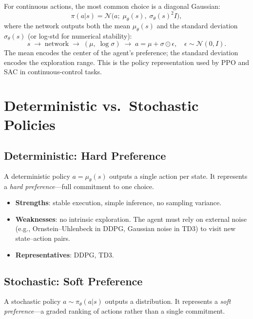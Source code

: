 For continuous actions, the most common choice is a diagonal Gaussian:
\begin{equation}
  \pi(a|s) = \mathcal{N}\!\bigl(a;\; \mu_\theta(s),\; \sigma_\theta(s)^2 I\bigr),
\end{equation}
where the network outputs both the mean $\mu_\theta(s)$ and the standard
deviation $\sigma_\theta(s)$ (or log-std for numerical stability):
\begin{equation}
  s \;\longrightarrow\; \text{network} \;\longrightarrow\;
  (\mu,\; \log\sigma)
  \;\longrightarrow\;
  a = \mu + \sigma \odot \epsilon,
  \quad \epsilon \sim \mathcal{N}(0, I).
\end{equation}
The mean encodes the center of the agent's preference; the standard deviation
encodes the exploration range.  This is the policy representation used by PPO
and SAC in continuous-control tasks.


\section{Deterministic vs.\ Stochastic Policies}
\label{sec:det-vs-stoch}

\subsection{Deterministic: Hard Preference}

A deterministic policy $a = \mu_\theta(s)$ outputs a single action per state.
It represents a \emph{hard preference}---full commitment to one choice.

\begin{itemize}[nosep]
  \item \textbf{Strengths}: stable execution, simple inference, no sampling
    variance.
  \item \textbf{Weaknesses}: no intrinsic exploration.  The agent must rely on
    external noise (e.g., Ornstein--Uhlenbeck in DDPG, Gaussian noise in TD3)
    to visit new state--action pairs.
  \item \textbf{Representatives}: DDPG, TD3.
\end{itemize}

\subsection{Stochastic: Soft Preference}

A stochastic policy $a \sim \pi_\theta(a|s)$ outputs a distribution.  It
represents a \emph{soft preference}---a graded ranking of actions rather than a
single commitment.

